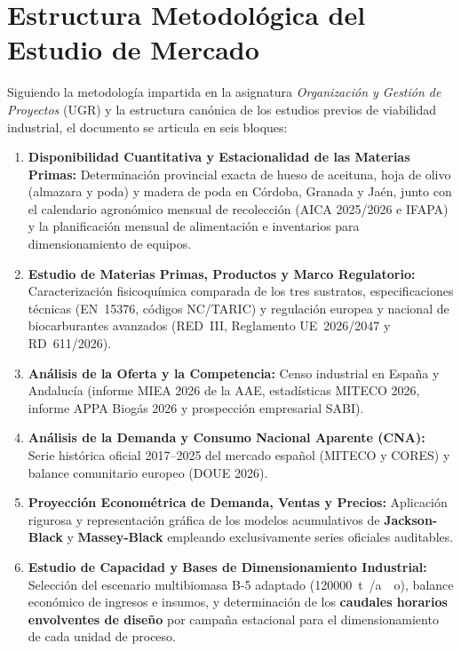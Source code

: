 \documentclass{report}
\begin{document}
\section{Estructura Metodológica del Estudio de Mercado}
Siguiendo la metodología impartida en la asignatura \textit{Organización y Gestión de Proyectos} (UGR) y la estructura canónica de los estudios previos de viabilidad industrial, el documento se articula en seis bloques:
\begin{enumerate}
    \item \textbf{Disponibilidad Cuantitativa y Estacionalidad de las Materias Primas:} Determinación provincial exacta de hueso de aceituna, hoja de olivo (almazara y poda) y madera de poda en Córdoba, Granada y Jaén, junto con el calendario agronómico mensual de recolección (AICA 2025/2026 e IFAPA) y la planificación mensual de alimentación e inventarios para dimensionamiento de equipos.
    \item \textbf{Estudio de Materias Primas, Productos y Marco Regulatorio:} Caracterización fisicoquímica comparada de los tres sustratos, especificaciones técnicas (EN~15376, códigos NC/TARIC) y regulación europea y nacional de biocarburantes avanzados (RED~III, Reglamento UE~2026/2047 y RD~611/2026).
    \item \textbf{Análisis de la Oferta y la Competencia:} Censo industrial en España y Andalucía (informe MIEA 2026 de la AAE, estadísticas MITECO 2026, informe APPA Biogás 2026 y prospección empresarial SABI).
    \item \textbf{Análisis de la Demanda y Consumo Nacional Aparente (CNA):} Serie histórica oficial 2017--2025 del mercado español (MITECO y CORES) y balance comunitario europeo (DOUE 2026).
    \item \textbf{Proyección Econométrica de Demanda, Ventas y Precios:} Aplicación rigurosa y representación gráfica de los modelos acumulativos de \textbf{Jackson-Black} y \textbf{Massey-Black} empleando exclusivamente series oficiales auditables.
    \item \textbf{Estudio de Capacidad y Bases de Dimensionamiento Industrial:} Selección del escenario multibiomasa B-5 adaptado (\SI{120000}{\tonne{}/ao}), balance económico de ingresos e insumos, y determinación de los \textbf{caudales horarios envolventes de diseño} por campaña estacional para el dimensionamiento de cada unidad de proceso.
\end{enumerate}


\end{document}
